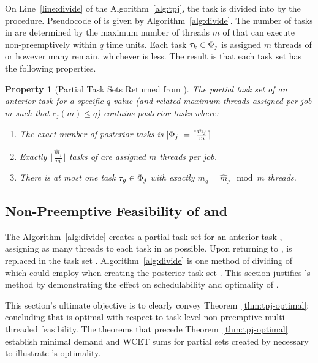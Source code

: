 \documentclass[a4paper,UKenglish,cleveref,autoref,english]{lipics-v2019}
\newtheorem{prop}{Property}
\begin{document}
On Line~\ref{line:divide} of the \tpj{} Algorithm~\ref{alg:tpj}, the task
 is divided into  by the 
procedure. Pseudocode of  is given by
Algorithm~\ref{alg:divide}. The number of tasks in  are
determined by the maximum number of threads ${m}$ of  that can
execute non-preemptively within ${q}$ time units. Each task ${\tau_{k}
  \in \Phi_{j}}$ is assigned ${m}$ threads of  or however
many remain, whichever is less. The result is that each task set
has the following properties. 

\begin{prop}[Partial Task Sets Returned from \texdivide{}]
  \label{prop:partial-task-set-size} The partial task set 
  of an anterior task \ants{} for a specific ${q}$ value (and related
  maximum threads assigned per job ${m}$ such that ${c_j(m) \le
    q}$) contains posterior tasks where:
  \begin{enumerate}
    \item The exact number of posterior tasks is ${|\Phi_{j}| = \lceil
      \frac{\hat{m}_j}{m} \rceil}$ 
    \item Exactly ${\lfloor \frac{\hat{m}_j}{m} \rfloor}$ tasks of
       are assigned ${m}$ threads per job.
    \item There is at most one task ${\tau_{g} \in \Phi_{j}}$ with
      exactly ${m_g = \hat{m}_j \mod m}$ threads.
  \end{enumerate}
  
\end{prop}

\subsection{Non-Preemptive Feasibility of \tpj{} and \texdivide{}}
\label{sec:feasibility}

The \texdivide{} Algorithm~\ref{alg:divide} creates a partial task set
 for an anterior task , assigning as many threads to
each task in  as possible. Upon returning  to
\tpj{},  is replaced in the task set \tasks{}.
Algorithm~\ref{alg:divide} is one method of dividing of  which
\tpj{} could employ when creating the posterior task set
\tasks{}. This section justifies \texdivide{}'s method
by demonstrating the effect on schedulability and optimality of
\tpj{}.

This section's ultimate objective is to clearly convey
Theorem~\ref{thm:tpj-optimal}; concluding that \tpj{} is optimal with
respect to task-level non-preemptive multi-threaded feasibility. The
theorems that precede Theorem~\ref{thm:tpj-optimal} establish minimal
demand and WCET sums for partial sets created by \texdivide{}
necessary to illustrate \tpj{}'s optimality.
\end{document}
